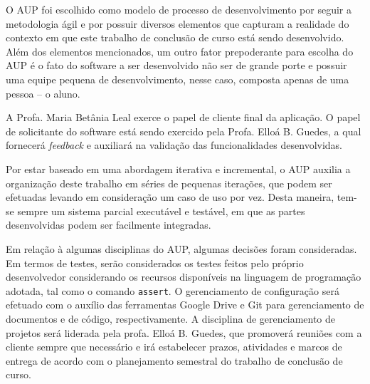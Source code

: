 O AUP foi escolhido como modelo de processo de desenvolvimento por seguir a metodologia ágil e por possuir diversos elementos que capturam a realidade do contexto em que este trabalho de conclusão de curso está sendo desenvolvido. Além dos elementos mencionados, um outro fator prepoderante para escolha do AUP é o fato do software a ser desenvolvido não ser de grande porte e possuir uma equipe pequena de desenvolvimento, nesse caso, composta apenas de uma pessoa -- o aluno.

A Profa. Maria Betânia Leal exerce o papel de cliente final da aplicação. O papel de solicitante do software está sendo exercido pela Profa. Elloá B. Guedes, a qual fornecerá \emph{feedback} e auxiliará na validação das funcionalidades desenvolvidas.

Por estar baseado em uma abordagem iterativa e incremental, o AUP auxilia a organização deste trabalho em séries de pequenas iterações, que podem ser efetuadas levando em consideração um caso de uso por vez. Desta maneira, tem-se sempre um sistema parcial executável e testável, em que as partes desenvolvidas podem ser facilmente integradas.

Em relação à algumas disciplinas do AUP, algumas decisões foram consideradas. Em termos de testes, serão considerados os testes feitos pelo próprio desenvolvedor considerando os recursos disponíveis na linguagem de programação adotada, tal como o comando \texttt{assert}. O gerenciamento de configuração será efetuado com o auxílio das ferramentas Google Drive e Git para gerenciamento de documentos e de código, respectivamente. A disciplina de gerenciamento de projetos será liderada pela profa. Elloá B. Guedes, que promoverá reuniões com a cliente sempre que necessário e irá estabelecer prazos, atividades e marcos de entrega de acordo com o planejamento semestral do trabalho de conclusão de curso.
